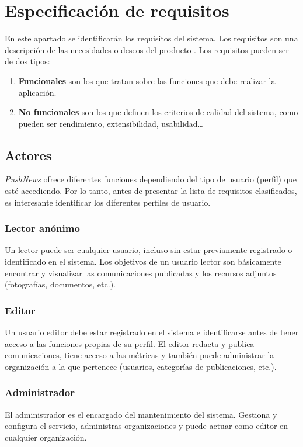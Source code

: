 \chapter{Especificación de requisitos}
En este apartado se identificarán los requisitos del sistema. Los requisitos son una descripción de las necesidades o deseos del producto \cite{Larman2004}. Los requisitos pueden ser de dos tipos:
\begin{enumerate}
    \item \textbf{Funcionales} son los que tratan sobre las funciones que debe realizar la aplicación.
    \item \textbf{No funcionales} son los que definen los criterios de calidad del sistema, como pueden ser rendimiento, extensibilidad, usabilidad\dots
\end{enumerate}

\section {Actores}
\emph{PushNews} ofrece diferentes funciones dependiendo del tipo de usuario (perfil) que esté accediendo. Por lo tanto, antes de presentar la lista de requisitos clasificados, es interesante identificar los diferentes perfiles de usuario.

\subsection{Lector anónimo}
Un lector puede ser cualquier usuario, incluso sin estar previamente registrado o identificado en el sistema. Los objetivos de un usuario lector son básicamente encontrar y visualizar las comunicaciones publicadas y los recursos adjuntos (fotografías, documentos, etc.).

\subsection{Editor}
Un usuario editor debe estar registrado en el sistema e identificarse antes de tener acceso a las funciones propias de su perfil. El editor redacta y publica comunicaciones, tiene acceso a las métricas y también puede administrar la organización a la que pertenece (usuarios, categorías de publicaciones, etc.).

\subsection{Administrador}
El administrador es el encargado del mantenimiento del sistema. Gestiona y configura el servicio, administras organizaciones y puede actuar como editor en cualquier organización.


